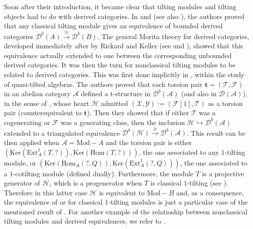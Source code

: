 \documentclass{proc-l}
\theoremstyle{definition}
\theoremstyle{remark}
\numberwithin{equation}{section}
\begin{document}
Soon after their introduction, it became clear that tilting modules and tilting objects had to do with derived categories. In \cite{CPS} and \cite{H} (see also \cite{H2}), the authors proved
that any classical tilting module gives an equivalence  of bounded derived categories $\mathcal{D}^b(A)\stackrel{\cong}{\longrightarrow}\mathcal{D}^b(B)$. The general Morita theory for derived categories, developed immediately after by Rickard and Keller (see \cite{R} and \cite{K}),  showed that this equivalence actually extended to one between the corresponding unbounded derived categories. It was then the turn for nonclassical tilting modules to be related to derived categories. This was first done  implicitly in \cite{HRS}, within the study of quasi-tilted algebras. The authors proved that each torsion pair $\mathbf{t}=(\mathcal{T},\mathcal{F})$ in an abelian category $\mathcal{A}$ defined a t-structure in $\mathcal{D}^b(\mathcal{A})$ (and also in $\mathcal{D}(\mathcal{A})$), in the sense of \cite{BBD}, whose heart $\mathcal{H}$ admitted  $(\mathcal{X},\mathcal{Y}):=(\mathcal{F}[1],\mathcal{T})$ as a torsion pair (counterequivalent to $\mathbf{t}$). Then they showed that 
 if either $\mathcal{T}$ was a cogenerating or $\mathcal{F}$ was a generating class, then the inclusion $\mathcal{H}\hookrightarrow\mathcal{D}^b(\mathcal{A})$ extended to a triangulated equivalence $\mathcal{D}^b(\mathcal{H})\stackrel{\cong}{\longrightarrow}\mathcal{D}^b(\mathcal{A})$. This  result can be then applied when $\mathcal{A}=\text{Mod}-A$ and the torsion pair is either $(\text{Ker}(\text{Ext}_A^1(T,?)),\text{Ker}(\text{Hom}(T,?)))$, the one associated to any $1$-tilting module, or $(\text{Ker}(\text{Hom}_A(?,Q)),\text{Ker}(\text{Ext}_A^1(?,Q)))$, the one associated to a $1$-cotilting module (defined dually). Furthermore, the module $T$ is a projective generator of $\mathcal{H}$, which is a progenerator when $T$ is classical $1$-tilting (see \cite[III.4]{BR}). Therefore in this latter case $\mathcal{H}$ is equivalent to $\text{Mod}-B$ and, as a consequence, the equivalence of \cite{CPS} or \cite{H} for classical 1-tilting modules is just a particular case of the mentioned result of 
 \cite{HRS}. For another example of the relatioship between nonclassical tilting modules and derived equivalences, we refer to \cite{BMT}.
\end{document}
